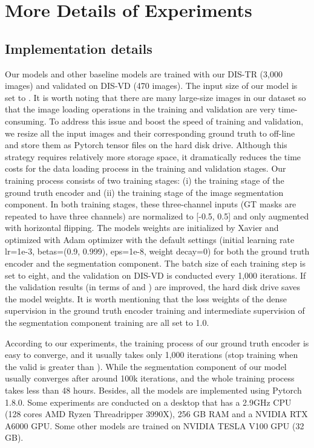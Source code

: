 \documentclass[10pt,twocolumn,letterpaper]{article}
\begin{document}
\section{More Details of Experiments}
\subsection{Implementation details} 
Our models and other baseline models are trained with our DIS-TR (3,000 images) and validated on DIS-VD (470 images). 
The input size of our model is set to . It is worth noting that there are many large-size images in our dataset so that the image loading operations in the training and validation are very time-consuming. To address this issue and boost the speed of training and validation, we resize all the input images and their corresponding ground truth to  off-line and store them as Pytorch tensor files on the hard disk drive. Although this strategy requires relatively more storage space, it dramatically reduces the time costs for the data loading process in the training and validation stages. 
Our training process consists of two training stages: (i) the training stage of the ground truth encoder and (ii) the training stage of the image segmentation component. 
In both training stages, these three-channel inputs (GT masks are repeated to have three channels) are normalized to [-0.5, 0.5] and only augmented with horizontal flipping. The models weights are initialized by Xavier \cite{DBLP:journals/jmlr/GlorotB10} and optimized with Adam \cite{kingma2014adam} optimizer with the default settings (initial learning rate lr=1e-3, betas=(0.9, 0.999), eps=1e-8, weight decay=0) for both the ground truth encoder and the segmentation component. The batch size of each training step is set to eight, and the validation on DIS-VD is conducted every 1,000 iterations. If the validation results (in terms of  and ) are improved, the hard disk drive saves the model weights. It is worth mentioning that the loss weights of the dense supervision in the ground truth encoder training and intermediate supervision of the segmentation component training are all set to 1.0. 

According to our experiments, the training process of our ground truth encoder is easy to converge, and it usually takes only 1,000 iterations (stop training when the valid  is greater than ). While the segmentation component of our model usually converges after around 100k iterations, and the whole training process takes less than 48 hours. Besides, all the models are implemented using Pytorch 1.8.0. Some experiments are conducted on a desktop that has a 2.9GHz CPU (128 cores AMD Ryzen Threadripper 3990X), 256 GB RAM and a NVIDIA RTX A6000 GPU. Some other models are trained on NVIDIA TESLA V100 GPU (32 GB).
\end{document}

